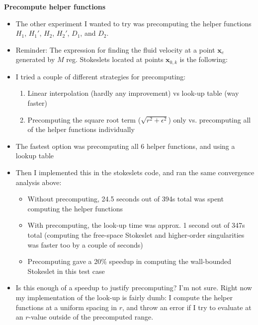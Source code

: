 \documentclass{article}
\begin{document}
\textbf{Precompute helper functions}
\begin{itemize}
\item The other experiment I wanted to try was precomputing the helper
  functions $H_1$, $H_1'$, $H_2$, $H_2'$, $D_1$, and $D_2$.
\item Reminder: The expression for finding the fluid velocity at a
  point $\mathbf{x}_e$ generated by $M$ reg. Stokeslets located at
  points $\mathbf{x}_{0, k}$ is the following:

\item I tried a couple of different strategies for precomputing:
  \begin{enumerate}
  \item Linear interpolation (hardly any improvement) vs look-up table
    (way faster)
  \item Precomputing the square root term ($\sqrt{r^2 + \epsilon^2}$)
    only vs. precomputing all of the helper functions individually
  \end{enumerate}
\item The fastest option was precomputing all 6 helper functions, and
  using a lookup table
\item Then I implemented this in the stokeslets code, and ran the same
  convergence analysis above:
  \begin{itemize}
  \item Without precomputing, 24.5 seconds out of 394s total was spent
    computing the helper functions
  \item With precomputing, the look-up time was approx. 1 second out
    of 347s total (computing the free-space Stokeslet and higher-order
    singularities was faster too by a couple of seconds)
  \item Precomputing gave a 20\% speedup in computing the wall-bounded
    Stokeslet in this test case
  \end{itemize}
\item Is this enough of a speedup to justify precomputing? I'm not
  sure. Right now my implementation of the look-up is fairly dumb: I
  compute the helper functions at a uniform spacing in $r$, and throw
  an error if I try to evaluate at an $r$-value outside of the
  precomputed range.
\end{itemize}
\end{document}
